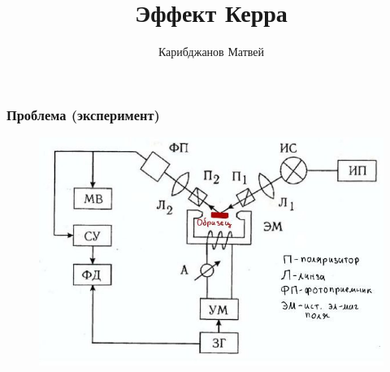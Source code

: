 \documentclass[handout]{beamer}
\title{Эффект Керра}
\author{Карибджанов Матвей}
\begin{document}
\begin{frame}%
    \titlepage
\end{frame}

\begin{frame}
    \frametitle{Проблема (эксперимент)}
    \begin{figure}[h]
        \centering
        \includegraphics[width=1\textwidth]{exp.jpg}
    \end{figure}
\end{frame}
\end{document}
